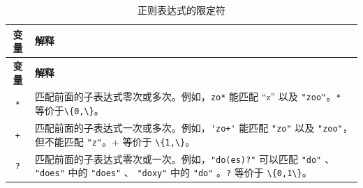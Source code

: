 \documentclass[doctor,openright,twoside]{sjtuthesis}
\newcommand{\passthrough}[1]{#1}
\theoremstyle{plain}
\theoremstyle{definition}
\theoremstyle{remark}
\theoremstyle{ocrenumbox}
\theoremstyle{plain}
\begin{document}
\begin{longtable}[]{@{}cl@{}}
\caption{正则表达式的限定符}\tabularnewline
\toprule
\begin{minipage}[b]{0.23\columnwidth}\centering
\textbf{变量}\strut
\end{minipage} & \begin{minipage}[b]{0.72\columnwidth}\raggedright
\textbf{解释}\strut
\end{minipage}\tabularnewline
\midrule
\endfirsthead
\toprule
\begin{minipage}[b]{0.23\columnwidth}\centering
\textbf{变量}\strut
\end{minipage} & \begin{minipage}[b]{0.72\columnwidth}\raggedright
\textbf{解释}\strut
\end{minipage}\tabularnewline
\midrule
\endhead
\begin{minipage}[t]{0.23\columnwidth}\centering
\passthrough{\lstinline!*!}\strut
\end{minipage} & \begin{minipage}[t]{0.72\columnwidth}\raggedright
匹配前面的子表达式零次或多次。例如，\passthrough{\lstinline!zo*!} 能匹配 ``z'' 以及 \passthrough{\lstinline!"zoo"!}。\passthrough{\lstinline!*!} 等价于\passthrough{\lstinline!\{0,\}!}。\strut
\end{minipage}\tabularnewline
\begin{minipage}[t]{0.23\columnwidth}\centering
\passthrough{\lstinline!+!}\strut
\end{minipage} & \begin{minipage}[t]{0.72\columnwidth}\raggedright
匹配前面的子表达式一次或多次。例如，\passthrough{\lstinline!'zo+'!} 能匹配 \passthrough{\lstinline!"zo"!} 以及 \passthrough{\lstinline!"zoo"!}，但不能匹配 \passthrough{\lstinline!"z"!}。+ 等价于 \passthrough{\lstinline!\{1,\}!}。\strut
\end{minipage}\tabularnewline
\begin{minipage}[t]{0.23\columnwidth}\centering
\passthrough{\lstinline!?!}\strut
\end{minipage} & \begin{minipage}[t]{0.72\columnwidth}\raggedright
匹配前面的子表达式零次或一次。例如，\passthrough{\lstinline!"do(es)?"!} 可以匹配 \passthrough{\lstinline!"do"!} 、 \passthrough{\lstinline!"does"!} 中的 \passthrough{\lstinline!"does"!} 、 \passthrough{\lstinline!"doxy"!} 中的 \passthrough{\lstinline!"do"!} 。\passthrough{\lstinline!?!} 等价于 \passthrough{\lstinline!\{0,1\}!}。\strut
\end{minipage}\tabularnewline

\end{longtable}
\end{document}
